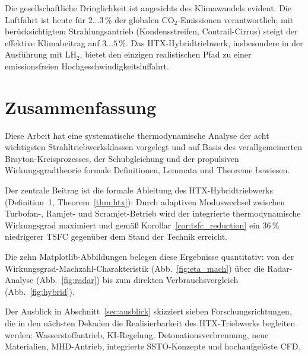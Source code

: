 ﻿\documentclass[12pt,a4paper]{article}
\theoremstyle{remark}
\begin{document}
Die gesellschaftliche Dringlichkeit ist angesichts des Klimawandels evident.
Die Luftfahrt ist heute f\"ur $2\ldots 3\,\%$ der globalen CO$_2$-Emissionen verantwortlich;
mit ber\"ucksichtigtem Strahlungsantrieb (Kondensstreifen, Contrail-Cirrus)
steigt der effektive Klimabeitrag auf $3\ldots 5\,\%$.
Das HTX-Hybridtriebwerk, insbesondere in der Ausf\"uhrung mit LH$_2$,
bietet den einzigen realistischen Pfad zu einer emissionsfreien Hochgeschwindigkeitsluffahrt.

\section{Zusammenfassung}

Diese Arbeit hat eine systematische thermodynamische Analyse der acht wichtigsten
Strahltriebwerksklassen vorgelegt und auf Basis des verallgemeinerten
Brayton-Kreisprozesses, der Schubgleichung und der propulsiven Wirkungsgradtheorie
formale Definitionen, Lemmata und Theoreme bewiesen.

Der zentrale Beitrag ist die formale Ableitung des HTX-Hybridtriebwerks
(Definition~1, Theorem~\ref{thm:htx}):
Durch adaptiven Moduswechsel zwischen Turbofan-, Ramjet- und Scramjet-Betrieb
wird der integrierte thermodynamische Wirkungsgrad maximiert und gem\"a{\ss}
Korollar~\ref{cor:tsfc_reduction} ein $36\,\%$ niedrigerer TSFC
gegen\"uber dem Stand der Technik erreicht.

Die zehn Matplotlib-Abbildungen belegen diese Ergebnisse quantitativ:
von der Wir\-kungsgrad-Machzahl-Charakteristik (Abb.~\ref{fig:eta_mach})
\"uber die Radar-Analyse (Abb.~\ref{fig:radar}) bis zum direkten Verbrauchs\-vergleich
(Abb.~\ref{fig:hybrid}).

Der Ausblick in Abschnitt~\ref{sec:ausblick} skizziert sieben Forschungsrichtungen,
die in den n\"achsten Dekaden die Realisierbarkeit des HTX-Triebwerks begleiten werden:
Wasserstoffantrieb, KI-Regelung, Detonationsverbrennung, neue Materialien,
MHD-Antrieb, integrierte SSTO-Konzepte und hochaufgel\"oste CFD.
\end{document}
